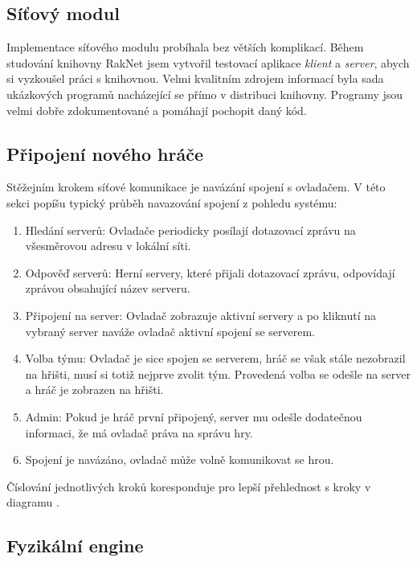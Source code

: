 \documentclass[thesis=B,czech,hidelinks]{FITthesis}[2012/06/26] %
\begin{document}

\subsection{Síťový modul}

Implementace síťového modulu probíhala bez větších komplikací. Během studování knihovny RakNet jsem vytvořil testovací aplikace \textit{klient} a \textit{server}, abych si vyzkoušel práci s knihovnou. Velmi kvalitním zdrojem informací byla sada ukázkových programů nacházející se přímo v distribuci knihovny. Programy jsou velmi dobře zdokumentované a pomáhají pochopit daný kód.

\subsection{Připojení nového hráče}

Stěžejním krokem síťové komunikace je navázání spojení s ovladačem. V této sekci popíšu typický průběh navazování spojení z pohledu systému:

\begin{enumerate}
	\item Hledání serverů: Ovladače periodicky posílají dotazovací zprávu na všesměrovou adresu v lokální síti.
	\item Odpověď serverů: Herní servery, které přijali dotazovací zprávu, odpovídají zprávou obsahující název serveru.
	\item Připojení na server: Ovladač zobrazuje aktivní servery a po kliknutí na vybraný server naváže ovladač aktivní spojení se serverem.
	\item Volba týmu: Ovladač je sice spojen se serverem, hráč se však stále nezobrazil na hřišti, musí si totiž nejprve zvolit tým. Provedená volba se odešle na server a hráč je zobrazen na hřišti.
	\item Admin: Pokud je hráč první připojený, server mu odešle dodatečnou informaci, že má ovladač práva na správu hry.
	\item Spojení je navázáno, ovladač může volně komunikovat se hrou.
\end{enumerate}

Číslování jednotlivých kroků koresponduje pro lepší přehlednost s kroky v diagramu . 

\subsection{Fyzikální engine}
\end{document}
